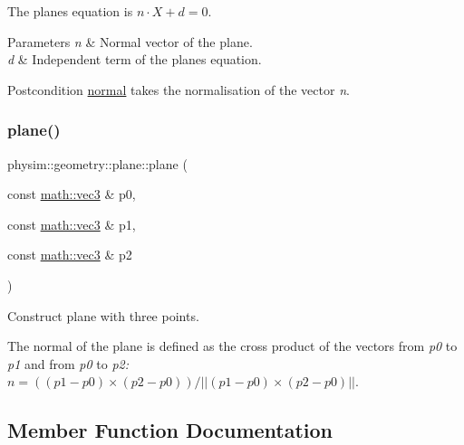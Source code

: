 The plane\textquotesingle{}s equation is $ n \cdot X + d = 0$. 
\begin{DoxyParams}{Parameters}
{\em n} & Normal vector of the plane. \\
\hline
{\em d} & Independent term of the plane\textquotesingle{}s equation. \\
\hline
\end{DoxyParams}
\begin{DoxyPostcond}{Postcondition}
\hyperlink{classphysim_1_1geometry_1_1plane_a51656a31e9c941542f17d47d2ab976bf}{normal} takes the normalisation of the vector {\itshape n}. 
\end{DoxyPostcond}
\mbox{\label{classphysim_1_1geometry_1_1plane_a7ff5e0444f792d759198fb7339c9dc1a}} 
\subsubsection{\texorpdfstring{plane()}{plane()}\hspace{0.1cm}{\footnotesize\ttfamily [3/3]}}
{\footnotesize\ttfamily physim\+::geometry\+::plane\+::plane (\begin{DoxyParamCaption}\item[{const \hyperlink{structphysim_1_1math_1_1vec3}{math\+::vec3} \&}]{p0,  }\item[{const \hyperlink{structphysim_1_1math_1_1vec3}{math\+::vec3} \&}]{p1,  }\item[{const \hyperlink{structphysim_1_1math_1_1vec3}{math\+::vec3} \&}]{p2 }\end{DoxyParamCaption})}



Construct plane with three points. 

The normal of the plane is defined as the cross product of the vectors from {\itshape p0} to {\itshape p1} and from {\itshape p0} to {\itshape p2\+:} $n = ( (p1 - p0) \times (p2 - p0) )/||(p1 - p0) \times (p2 - p0)|| $. 

\subsection{Member Function Documentation}
\mbox{\label{classphysim_1_1geometry_1_1plane_a508d6f69330663a1c2d02a3ca7ac2762}} 
